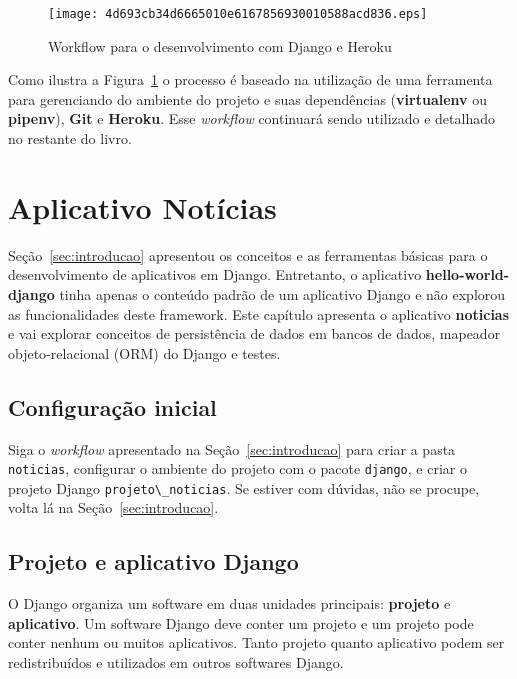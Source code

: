 \documentclass[brazil,a4paper,oneside,openright,parskip=full]{book}
\newcommand{\passthrough}[1]{#1}
\begin{document}
\begin{figure}
\hypertarget{fig:workflow-inicio}{%
\centering
\texttt{[image: 4d693cb34d6665010e6167856930010588acd836.eps]}
\caption{Workflow para o desenvolvimento com Django e
Heroku\label{fig:workflow-inicio}}\label{fig:workflow-inicio}
}
\end{figure}

Como ilustra a Figura~\ref{fig:workflow-inicio} o processo é baseado na
utilização de uma ferramenta para gerenciando do ambiente do projeto e
suas dependências (\textbf{virtualenv} ou \textbf{pipenv}), \textbf{Git}
e \textbf{Heroku}. Esse \emph{workflow} continuará sendo utilizado e
detalhado no restante do livro.

\hypertarget{sec:app-noticias}{%
\chapter{Aplicativo Notícias}\label{sec:app-noticias}}

Seção~\ref{sec:introducao} apresentou os conceitos e as ferramentas
básicas para o desenvolvimento de aplicativos em Django. Entretanto, o
aplicativo \textbf{hello-world-django} tinha apenas o conteúdo padrão de
um aplicativo Django e não explorou as funcionalidades deste framework.
Este capítulo apresenta o aplicativo \textbf{noticias} e vai explorar
conceitos de persistência de dados em bancos de dados, mapeador
objeto-relacional (ORM) do Django e testes.

\hypertarget{configurauxe7uxe3o-inicial}{%
\section{Configuração inicial}\label{configurauxe7uxe3o-inicial}}

Siga o \emph{workflow} apresentado na Seção~\ref{sec:introducao} para
criar a pasta \passthrough{\lstinline!noticias!}, configurar o ambiente
do projeto com o pacote \passthrough{\lstinline!django!}, e criar o
projeto Django \passthrough{\lstinline!projeto\_noticias!}. Se estiver
com dúvidas, não se procupe, volta lá na Seção~\ref{sec:introducao}.

\hypertarget{projeto-e-aplicativo-django}{%
\section{Projeto e aplicativo
Django}\label{projeto-e-aplicativo-django}}

O Django organiza um software em duas unidades principais:
\textbf{projeto} e \textbf{aplicativo}. Um software Django deve conter
um projeto e um projeto pode conter nenhum ou muitos aplicativos. Tanto
projeto quanto aplicativo podem ser redistribuídos e utilizados em
outros softwares Django.
\end{document}
